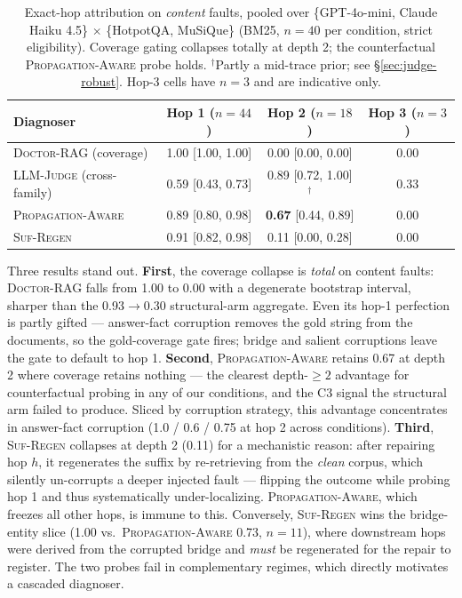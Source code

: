 \documentclass[11pt]{article}
\newcommand{\dr}{\textnormal{\textsc{Doctor-RAG}}}
\newcommand{\pa}{\textnormal{\textsc{Propagation-Aware}}}
\newcommand{\lj}{\textnormal{\textsc{LLM-Judge}}}
\newcommand{\sr}{\textnormal{\textsc{Suf-Regen}}}
\begin{document}
\begin{table}[t]
\centering
\small
\begin{tabular}{lccc}
\toprule
Diagnoser & Hop 1 ($n{=}44$) & Hop 2 ($n{=}18$) & Hop 3 ($n{=}3$) \\
\midrule
\dr{} (coverage)      & 1.00 [1.00, 1.00] & 0.00 [0.00, 0.00] & 0.00 \\
\lj{} (cross-family)  & 0.59 [0.43, 0.73] & 0.89 [0.72, 1.00]$^\dagger$ & 0.33 \\
\pa{}                 & 0.89 [0.80, 0.98] & \textbf{0.67} [0.44, 0.89] & 0.00 \\
\sr{}                 & 0.91 [0.82, 0.98] & 0.11 [0.00, 0.28] & 0.00 \\
\bottomrule
\end{tabular}
\caption{Exact-hop attribution on \emph{content} faults, pooled over
\{GPT-4o-mini, Claude Haiku 4.5\} $\times$ \{HotpotQA, MuSiQue\} (BM25,
$n{=}40$ per condition, strict eligibility).  Coverage gating collapses
totally at depth 2; the counterfactual \pa{} probe holds.  $^\dagger$Partly a
mid-trace prior; see \S\ref{sec:judge-robust}.  Hop-3 cells have $n{=}3$ and
are indicative only.}
\label{tab:content-acc}
\end{table}

Three results stand out.  \textbf{First}, the coverage collapse is \emph{total}
on content faults: \dr{} falls from 1.00 to 0.00 with a degenerate bootstrap
interval, sharper than the 0.93$\rightarrow$0.30 structural-arm aggregate.
Even its hop-1 perfection is partly gifted --- answer-fact corruption removes
the gold string from the documents, so the gold-coverage gate fires; bridge and
salient corruptions leave the gate to default to hop 1.  \textbf{Second}, \pa{}
retains 0.67 at depth 2 where coverage retains nothing --- the clearest
depth-$\geq 2$ advantage for counterfactual probing in any of our conditions,
and the C3 signal the structural arm failed to produce.  Sliced by corruption
strategy, this advantage concentrates in answer-fact corruption (1.0 / 0.6 /
0.75 at hop 2 across conditions).  \textbf{Third}, \sr{} collapses at depth 2
(0.11) for a mechanistic reason: after repairing hop $h$, it regenerates the
suffix by re-retrieving from the \emph{clean} corpus, which silently
un-corrupts a deeper injected fault --- flipping the outcome while probing
hop 1 and thus systematically under-localizing.  \pa{}, which freezes all other
hops, is immune to this.  Conversely, \sr{} wins the bridge-entity slice (1.00
vs.\ \pa{} 0.73, $n{=}11$), where downstream hops were derived from the
corrupted bridge and \emph{must} be regenerated for the repair to register.
The two probes fail in complementary regimes, which directly motivates a
cascaded diagnoser.
\end{document}
